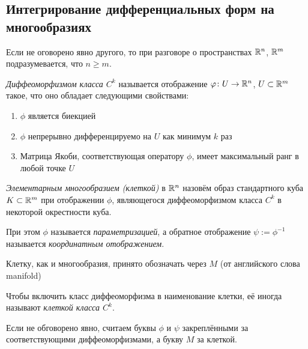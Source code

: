 \subsection{Интегрирование дифференциальных форм на многообразиях}

\begin{note}
	Если не оговорено явно другого, то при разговоре о пространствах $\mathbb{R}^n$, $\mathbb{R}^m$ подразумевается, что $n \ge m$.
\end{note}

\begin{definition}
	\textit{Диффеоморфизмом класса $C^k$} называется отображение $\varphi \colon U \to \mathbb{R}^n$, $U \subset \mathbb{R}^m$ такое, что оно обладает следующими свойствами:
	\begin{enumerate}
		\item $\phi$ является биекцией
		
		\item $\phi$ непрерывно дифференцируемо на $U$ как минимум $k$ раз
		
		\item Матрица Якоби, соответствующая оператору $\phi$, имеет максимальный ранг в любой точке $U$
	\end{enumerate}
\end{definition}

\begin{definition}
	\textit{Элементарным многообразием (клеткой)} в $\mathbb{R}^n$ назовём образ стандартного куба $K \subset \mathbb{R}^m$ при отображении $\phi$, являющегося диффеоморфизмом класса $C^k$ в некоторой окрестности куба.
	
	При этом $\phi$ называется \textit{параметризацией}, а обратное отображение $\psi := \phi^{-1}$ называется \textit{координатным отображением}.
\end{definition}

\begin{note}
	Клетку, как и многообразия, принято обозначать через $M$ (от английского слова manifold)
\end{note}

\begin{note}
	Чтобы включить класс диффеоморфизма в наименование клетки, её иногда называют \textit{клеткой класса $C^k$}.
\end{note}

\begin{note}
	Если не обговорено явно, считаем буквы $\phi$ и $\psi$ закреплёнными за соответствующими диффеоморфизмами, а букву $M$ за клеткой.
\end{note}

